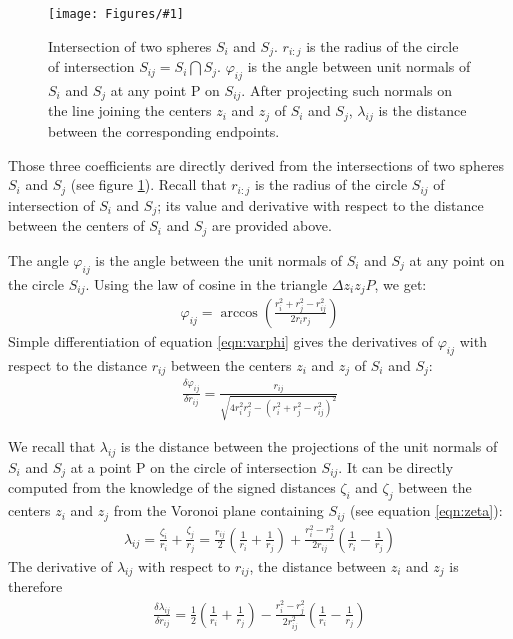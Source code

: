 \documentclass[11 pt]{article}
\theoremstyle{plain} \theorembodyfont{\rmfamily}
\newcommand{\centerfig}[2]{%
\centerline{\texttt{[image: Figures/\#1]}}
}
\begin{document}
 \begin{figure}[hbt]
\centerfig{Twosphere2}{height=2in}
\caption{ Intersection of two spheres $S_i$ and $S_j$. $r_{i:j}$ is the radius of the circle of intersection $S_{ij}=S_i\bigcap S_j$. $\varphi_{ij}$ is the angle between unit normals of $S_i$ and $S_j$ at any point P on $S_{ij}$. After projecting such normals on the line joining the centers $z_i$ and $z_j$ of $S_i$ and $S_j$, $\lambda_{ij}$ is the distance between the corresponding endpoints.}
\label{fig:twosphere2}
\end{figure}

Those three coefficients are directly derived from the intersections of two spheres $S_i$ and $S_j$ (see figure \ref{fig:twosphere2}). Recall that $r_{i:j}$ is the radius of the circle $S_{ij}$ of intersection of $S_i$ and $S_j$; its value and derivative with respect to the distance between the centers of $S_i$ and $S_j$ are provided above.

The angle $\varphi_{ij}$ is the angle between the unit normals of $S_i$ and $S_j$ at any point on the circle $S_{ij}$. Using the law of cosine in the triangle $\Delta z_i z_j P$, we get:
\begin{eqnarray}
\varphi_{ij} = \arccos \left( \frac{ r_i^2 + r_j^2 - r_{ij}^2 }{2r_ir_j} \right)
\label{eqn:varphi}
\end{eqnarray}
Simple differentiation of equation \ref{eqn:varphi} gives the derivatives of $\varphi_{ij}$ with respect to the distance $r_{ij}$ between the centers $z_i$ and $z_j$ of $S_i$ and $S_j$:
\begin{eqnarray}
\frac{ \delta \varphi_{ij}}{\delta r_{ij}} = \frac{r_{ij}} {\sqrt{4r_i^2r_j^2 - (r_i^2+r_j^2-r_{ij}^2)^2}}
\label{eqn:dvarphi}
\end{eqnarray}

We recall that $\lambda_{ij}$ is the distance between the projections of the unit normals of $S_i$ and $S_j$ at a point P on the circle of intersection $S_{ij}$. It can be directly computed from the knowledge of the signed distances $\zeta_i$ and $\zeta_j$ between the centers $z_i$ and $z_j$ from the Voronoi plane containing $S_{ij}$ (see equation \ref{eqn:zeta}):
\begin{eqnarray}
\lambda_{ij} = \frac{\zeta_i}{r_i} + \frac{\zeta_j}{r_j} = \frac{r_{ij}}{2}\left(\frac{1}{r_i}+\frac{1}{r_j}\right) + \frac{r_i^2-r_j^2}{2r_{ij}}\left(\frac{1}{r_i}-\frac{1}{r_j}\right)
\end{eqnarray}
The derivative of $\lambda_{ij}$ with respect to $r_{ij}$, the distance between $z_i$ and $z_j$ is therefore
\begin{eqnarray}
\frac{\delta \lambda_{ij}}{\delta r_{ij}} = \frac{1}{2}\left(\frac{1}{r_i}+\frac{1}{r_j}\right) - \frac{r_i^2-r_j^2}{2r_{ij}^2}\left(\frac{1}{r_i}-\frac{1}{r_j}\right)
\end{eqnarray}
\end{document}
